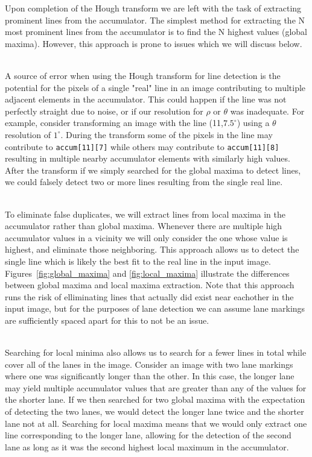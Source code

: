 \documentclass[epsfig,10pt,fullpage]{article}
\begin{document}
Upon completion of the Hough transform we are left with the task of extracting prominent lines from the accumulator.
The simplest method for extracting the N most prominent lines from the accumulator is to 
find the N highest values (global maxima). However, this approach is prone to issues which we will discuss below.

~\\
A source of error when using the Hough transform for line detection is the potential for  
the pixels of a single "real" line in an image contributing to multiple adjacent elements in 
the accumulator. This could happen if the line was not perfectly straight due to noise, or if 
our resolution for $\rho$ or $\theta$ was inadequate. For example, consider transforming an image with the line 
(11,$7.5^\circ$) using a $\theta$ resolution of $1^\circ$. During the transform some of the pixels in the line may
contribute to \texttt{accum[11][7]} while others may contribute to \texttt{accum[11][8]} resulting in
multiple nearby accumulator elements with similarly high values.
After the transform if we simply searched for the global maxima to detect lines,
we could falsely detect two or more lines resulting from the single real line.

~\\
To eliminate false duplicates, we will extract lines from local maxima in the accumulator rather than global maxima.
Whenever there are multiple high accumulator values in a vicinity we will only consider the one whose 
value is highest, and eliminate those neighboring. This approach allows us to detect the single line which is likely the best
fit to the real line in the input image. 
Figures~\ref{fig:global_maxima} and \ref{fig:local_maxima} illustrate the differences between global maxima and
local maxima extraction. Note that this approach runs the risk of elliminating lines that actually did exist near eachother
in the input image, but for the purposes of lane detection we can assume lane markings are sufficiently spaced apart for
this to not be an issue.

~\\
Searching for local minima also allows us to search for a fewer lines in total while cover all of the lanes in the image. 
Consider an image with two lane markings where one was significantly longer than the other. In this case,
the longer lane may yield multiple accumulator values that are greater than any of the values
for the shorter lane. If we then searched for two global maxima with the expectation of detecting the two lanes, 
we would detect the longer lane twice and the shorter lane not at all. Searching for local maxima means that we would
only extract one line corresponding to the longer lane, allowing for the detection of the second lane as long as it was the
second highest local maximum in the accumulator.
\end{document}
